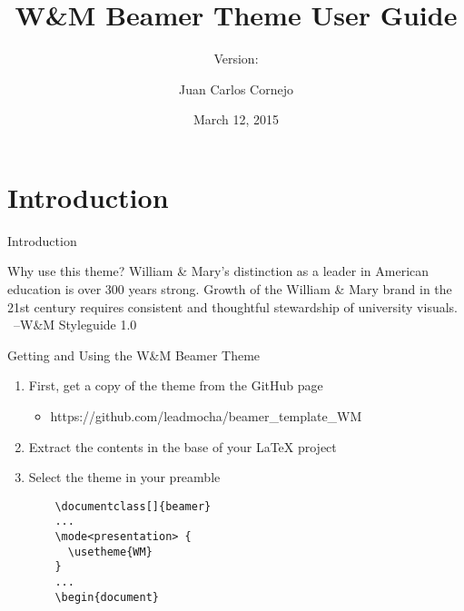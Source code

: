 \documentclass[xcolor=table,compress,pdfpagelabels]{beamer}
\author{Juan Carlos Cornejo}
\title{W\&M Beamer Theme User Guide}
\subtitle{Version: \thisDocumentVersion}
\institute{The College of William \& Mary}
\date{March 12, 2015}
\begin{document}
\begin{frame}[plain]
 \titlepage
\end{frame}


\section{Introduction}
\begin{frame}{Introduction}
\begin{center}
\end{center}
\end{frame}

\begin{quoteframe}{Why use this theme?}
William \& Mary's distinction as a leader in American education is over 300 years strong. Growth of the William \& Mary brand in the 21st century requires consistent and thoughtful stewardship of university visuals.\\
\ \hfill--W\&M Styleguide 1.0
\end{quoteframe}

\begin{frame}[fragile]{Getting and Using the W\&M Beamer Theme}
\begin{enumerate}
  \item First, get a copy of the theme from the GitHub page
  \begin{itemize}
    \item https://github.com/leadmocha/beamer\_template\_WM
  \end{itemize}
  \item Extract the contents in the base of your LaTeX project
  \item Select the theme in your preamble
  \begin{verbatim}
    \documentclass[]{beamer}
    ...
    \mode<presentation> {
      \usetheme{WM}
    }
    ...
    \begin{document}
  \end{verbatim}
\end{enumerate}
\end{frame}
\end{document}
